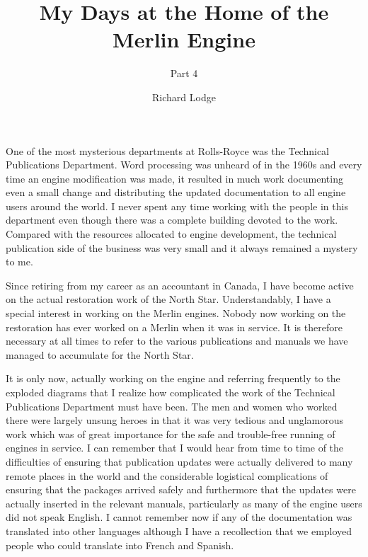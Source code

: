 %


\title{My Days at the Home of the Merlin Engine}
\subtitle{Part 4}
\author{Richard Lodge}

\maketitle

One of the most mysterious departments at Rolls-Royce was the
Technical Publications Department. Word processing was unheard of in
the 1960s and every time an engine modification was made, it resulted
in much work documenting even a small change and distributing the
updated documentation to all engine users around the world. I never
spent any time working with the people in this department even though
there was a complete building devoted to the work. Compared with the
resources allocated to engine development, the technical publication
side of the business was very small and it always remained a mystery
to me.

Since retiring from my career as an accountant in Canada, I have
become active on the actual restoration work of the North
Star. Understandably, I have a special interest in working on the
Merlin engines. Nobody now working on the restoration has ever worked
on a Merlin when it was in service. It is therefore necessary at all
times to refer to the various publications and manuals we have managed
to accumulate for the North Star.

It is only now, actually working on the engine and referring
frequently to the exploded diagrams that I realize how complicated the
work of the Technical Publications Department must have been. The men
and women who worked there were largely unsung heroes in that it was
very tedious and unglamorous work which was of great importance for
the safe and trouble-free running of engines in service. I can
remember that I would hear from time to time of the difficulties of
ensuring that publication updates were actually delivered to many
remote places in the world and the considerable logistical
complications of ensuring that the packages arrived safely and
furthermore that the updates were actually inserted in the relevant
manuals, particularly as many of the engine users did not speak
English. I cannot remember now if any of the documentation was
translated into other languages although I have a recollection that we
employed people who could translate into French and Spanish.

